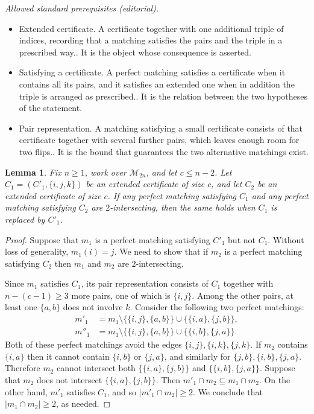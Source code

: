 \documentclass[10pt,a4paper]{article}
\newtheorem{lemma}[theorem]{Lemma}
\theoremstyle{definition}
\providecommand{\cM}{\mathcal{M}}
\begin{document}
\noindent\textit{Allowed standard prerequisites (editorial).}\begin{itemize}
\item Extended certificate. A certificate together with one additional triple of indices, recording that a matching satisfies the pairs and the triple in a prescribed way.. It is the object whose consequence is asserted.
\item Satisfying a certificate. A perfect matching satisfies a certificate when it contains all its pairs, and it satisfies an extended one when in addition the triple is arranged as prescribed.. It is the relation between the two hypotheses of the statement.
\item Pair representation. A matching satisfying a small certificate consists of that certificate together with several further pairs, which leaves enough room for two flips.. It is the bound that guarantees the two alternative matchings exist.
\end{itemize}\medskip
\begin{lemma} \label{lem:extended-certificates}
Fix $n \geq 1$, work over $\cM_{2n}$, and let $c \leq n - 2$. Let $C_1 = (C'_1,\{i,j,k\})$ be an extended certificate of size $c$, and let $C_2$ be an extended certificate of size $c$. If any perfect matching satisfying $C_1$ and any perfect matching satisfying $C_2$ are $2$-intersecting, then the same holds when $C_1$ is replaced by $C'_1$.
\end{lemma}

\begin{proof}
Suppose that $m_1$ is a perfect matching satisfying $C'_1$ but not $C_1$. Without loss of generality, $m_1(i) = j$. We need to show that if $m_2$ is a perfect matching satisfying $C_2$ then $m_1$ and $m_2$ are $2$-intersecting.

Since $m_1$ satisfies $C_1$, its pair representation consists of $C_1$ together with $n-(c-1) \geq 3$ more pairs, one of which is $\{i,j\}$. Among the other pairs, at least one $\{a,b\}$ does not involve $k$. Consider the following two perfect matchings:
\begin{align*}
    m'_1 &= m_1 \setminus \bigl\{\{i,j\}, \{a,b\}\bigr\} \cup \bigl\{ \{i,a\}, \{j,b\} \bigr\}, \\
    m''_1 &= m_1 \setminus \bigl\{\{i,j\}, \{a,b\}\bigr\} \cup \bigl\{ \{i,b\}, \{j,a\} \bigr\}.
\end{align*}
Both of these perfect matchings avoid the edges $\{i,j\},\{i,k\},\{j,k\}$. If $m_2$ contains $\{i,a\}$ then it cannot contain $\{i,b\}$ or $\{j,a\}$, and similarly for $\{j,b\},\{i,b\},\{j,a\}$. Therefore $m_2$ cannot intersect both $\bigl\{ \{i,a\}, \{j,b\} \bigr\}$ and $\bigl\{ \{i,b\}, \{j,a\} \bigr\}$. Suppose that $m_2$ does not intersect $\bigl\{ \{i,a\}, \{j,b\} \bigr\}$. Then $m'_1 \cap m_2 \subseteq m_1 \cap m_2$. On the other hand, $m'_1$ satisfies $C_1$, and so $|m'_1 \cap m_2| \geq 2$. We conclude that $|m_1 \cap m_2| \geq 2$, as needed.
\end{proof}
\end{document}
